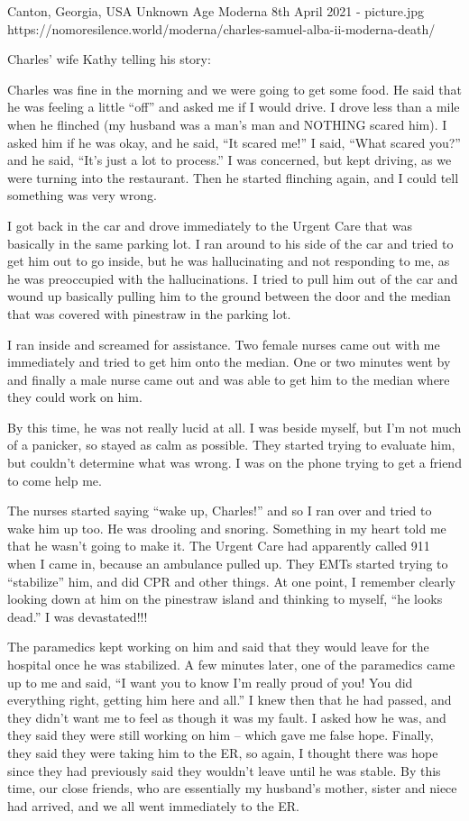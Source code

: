 {Canton, Georgia, USA}
{Unknown Age}
{Moderna}
{8th April 2021}
{-}
{picture.jpg}
{https://nomoresilence.world/moderna/charles-samuel-alba-ii-moderna-death/}
{

\normalsize

Charles’ wife Kathy telling his story:

Charles was fine in the morning and we were going to get some food. He said that he was feeling a little “off” and asked me if I would drive. I drove less than a mile when he flinched (my husband was a man’s man and NOTHING scared him). I asked him if he was okay, and he said, “It scared me!” I said, “What scared you?” and he said, “It’s just a lot to process.” I was concerned, but kept driving, as we were turning into the restaurant. Then he started flinching again, and I could tell something was very wrong.

I got back in the car and drove immediately to the Urgent Care that was basically in the same parking lot. I ran around to his side of the car and tried to get him out to go inside, but he was hallucinating and not responding to me, as he was preoccupied with the hallucinations. I tried to pull him out of the car and wound up basically pulling him to the ground between the door and the median that was covered with pinestraw in the parking lot.

I ran inside and screamed for assistance. Two female nurses came out with me immediately and tried to get him onto the median. One or two minutes went by and finally a male nurse came out and was able to get him to the median where they could work on him.

By this time, he was not really lucid at all. I was beside myself, but I’m not much of a panicker, so stayed as calm as possible. They started trying to evaluate him, but couldn’t determine what was wrong. I was on the phone trying to get a friend to come help me.

The nurses started saying “wake up, Charles!” and so I ran over and tried to wake him up too. He was drooling and snoring. Something in my heart told me that he wasn’t going to make it. The Urgent Care had apparently called 911 when I came in, because an ambulance pulled up. They EMTs started trying to “stabilize” him, and did CPR and other things. At one point, I remember clearly looking down at him on the pinestraw island and thinking to myself, “he looks dead.” I was devastated!!!

The paramedics kept working on him and said that they would leave for the hospital once he was stabilized. A few minutes later, one of the paramedics came up to me and said, “I want you to know I’m really proud of you! You did everything right, getting him here and all.” I knew then that he had passed, and they didn’t want me to feel as though it was my fault.
I asked how he was, and they said they were still working on him – which gave me false hope. Finally, they said they were taking him to the ER, so again, I thought there was hope since they had previously said they wouldn’t leave until he was stable. By this time, our close friends, who are essentially my husband’s mother, sister and niece had arrived, and we all went immediately to the ER.

}
